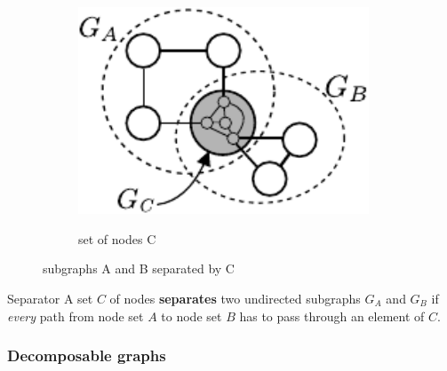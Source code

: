 \begin{frame}
{\begin{figure}[h]
\begin{subfigure}[t]{0.4\textwidth}
{         \includegraphics[width=0.95\textwidth]{img/section3_fig10_cset}
         }
         \caption{set of nodes C}
         \label{fig:setc}
     \end{subfigure}
     \caption{subgraphs A and B separated by C}
	 \label{fig:regression}
\end{figure}
}
	\slidesonly{\vspace{-2mm}}
	\begin{block}{Separator}
		A set $C$ of nodes \textbf{separates} two undirected subgraphs $G_A$ and $G_B$ 
		if \emph{every} path from node set $A$ to node set $B$ 
		has to pass through an element of $C$.
	\end{block}
\end{frame}

\subsubsection{Decomposable graphs}

